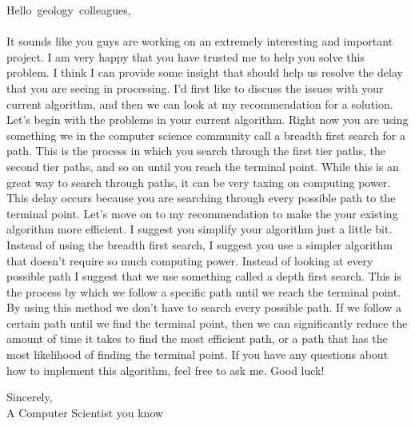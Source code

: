 \documentclass[12pt]{article}
\begin{document}
\newpage
\mbox{Hello geology colleagues,}
\\ \\ It sounds like you guys are working on an extremely interesting and important project. I am very happy that you have trusted me to help you solve this problem. I think I can provide some insight that should help us resolve the delay that you are seeing in processing. I'd first like to discuss the issues with your current algorithm, and then we can look at my recommendation for a solution. Let's begin with the problems in your current algorithm. Right now you are using something we in the computer science community call a breadth first search for a path. This is the process in which you search through the first tier paths, the second tier paths, and so on until you reach the terminal point. While this is an great way to search through paths, it can be very taxing on computing power. This delay occurs because you are searching through every possible path to the terminal point. Let's move on to my recommendation to make the your existing algorithm more efficient. I suggest you simplify your algorithm just a little bit. Instead of using the breadth first search, I suggest you use a simpler algorithm that doesn't require so much computing power. Instead of looking at every possible path I suggest that we use something called a depth first search. This is the process by which we follow a specific path until we reach the terminal point. By using this method we don't have to search every possible path. If we follow a certain path until we find the terminal point, then  we can significantly reduce the amount of time it takes to find the most efficient path, or a path that has the most likelihood of finding the terminal point. If you have any questions about how to implement this algorithm, feel free to ask me. Good luck!

Sincerely,
\\A Computer Scientist you know
\newpage 
\pagebreak
\end{document}
